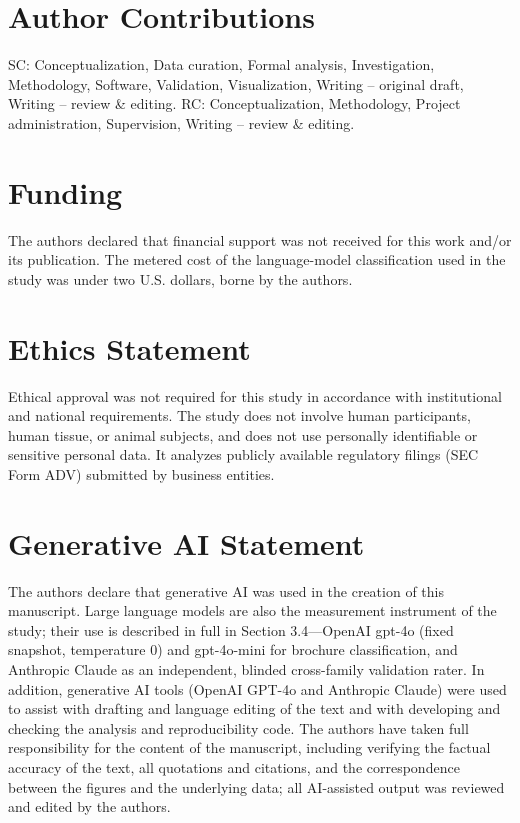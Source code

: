 \documentclass[utf8]{FrontiersinHarvard}
\begin{document}
\section*{Author Contributions}
SC: Conceptualization, Data curation, Formal analysis, Investigation, Methodology, Software, Validation, Visualization, Writing -- original draft, Writing -- review \& editing. RC: Conceptualization, Methodology, Project administration, Supervision, Writing -- review \& editing.

\section*{Funding}
The authors declared that financial support was not received for this work and/or its publication. The metered cost of the language-model classification used in the study was under two U.S. dollars, borne by the authors.

\section*{Ethics Statement}
Ethical approval was not required for this study in accordance with institutional and national requirements. The study does not involve human participants, human tissue, or animal subjects, and does not use personally identifiable or sensitive personal data. It analyzes publicly available regulatory filings (SEC Form ADV) submitted by business entities.

\section*{Generative AI Statement}
The authors declare that generative AI was used in the creation of this manuscript. Large language models are also the measurement instrument of the study; their use is described in full in Section 3.4---OpenAI gpt-4o (fixed snapshot, temperature 0) and gpt-4o-mini for brochure classification, and Anthropic Claude as an independent, blinded cross-family validation rater. In addition, generative AI tools (OpenAI GPT-4o and Anthropic Claude) were used to assist with drafting and language editing of the text and with developing and checking the analysis and reproducibility code. The authors have taken full responsibility for the content of the manuscript, including verifying the factual accuracy of the text, all quotations and citations, and the correspondence between the figures and the underlying data; all AI-assisted output was reviewed and edited by the authors.
\end{document}
